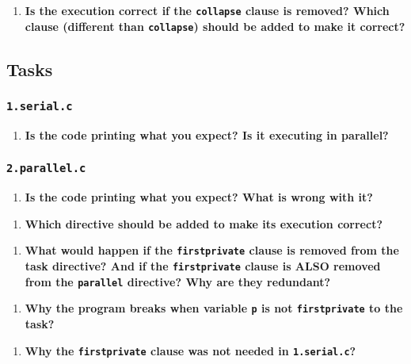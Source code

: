 \documentclass[a4paper]{article}
\begin{document}
\begin{enumerate}[resume]
	\item \textbf{Is the execution correct if the \texttt{collapse} clause is removed? Which clause (different than \texttt{collapse}) should be added to make it correct?}
\end{enumerate}

\subsection{Tasks}
\subsubsection{\texttt{1.serial.c}}

\begin{enumerate}
	\item \textbf{Is the code printing what you expect? Is it executing in parallel?}
\end{enumerate}

\subsubsection{\texttt{2.parallel.c}}
\begin{enumerate}
	\item \textbf{Is the code printing what you expect? What is wrong with it?}
\end{enumerate}

\begin{enumerate}[resume]
	\item \textbf{Which directive should be added to make its execution correct?}
\end{enumerate}

\begin{enumerate}[resume]
	\item \textbf{What would happen if the \texttt{firstprivate} clause is removed from the task directive? And if the \texttt{firstprivate} clause is ALSO removed from the \texttt{parallel} directive? Why are they redundant?}
\end{enumerate}

\begin{enumerate}[resume]
	\item \textbf{Why the program breaks when variable \texttt{p} is not \texttt{firstprivate} to the task?}
\end{enumerate}

\begin{enumerate}[resume]
	\item \textbf{Why the \texttt{firstprivate} clause was not needed in \texttt{1.serial.c}?}
\end{enumerate}
\end{document}

